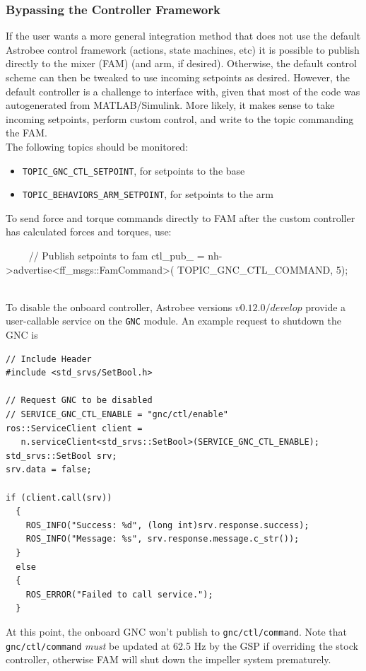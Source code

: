\documentclass{article}
\begin{document}
\subsubsection{Bypassing the Controller Framework}

If the user wants a more general integration method that does not use the default Astrobee control framework (actions, state machines, etc) it is possible to publish directly to the mixer (FAM) (and arm, if desired). Otherwise, the default control scheme can then be tweaked to use incoming setpoints as desired. However, the default controller is a challenge to interface with, given that most of the code was autogenerated from MATLAB/Simulink. More likely, it makes sense to take incoming setpoints, perform custom control, and write to the topic commanding the FAM.\\

The following topics should be monitored:
\begin{itemize}
	\item \texttt{TOPIC\_GNC\_CTL\_SETPOINT}, for setpoints to the base
	\item \texttt{TOPIC\_BEHAVIORS\_ARM\_SETPOINT}, for setpoints to the arm
\end{itemize}

\indent To send force and torque commands directly to FAM after the custom controller has calculated forces and torques, use:
\begin{markdown}
~~~~
//  Publish setpoints to fam
ctl_pub_ = nh->advertise<ff_msgs::FamCommand>(
TOPIC_GNC_CTL_COMMAND, 5);
~~~~
\end{markdown}

To disable the onboard controller, Astrobee versions $v0.12.0/develop$ provide a user-callable service 
on the \texttt{GNC} module. An example request to shutdown the GNC is
\begin{lstlisting}
// Include Header 
#include <std_srvs/SetBool.h>

// Request GNC to be disabled
// SERVICE_GNC_CTL_ENABLE = "gnc/ctl/enable" 
ros::ServiceClient client = 
   n.serviceClient<std_srvs::SetBool>(SERVICE_GNC_CTL_ENABLE);
std_srvs::SetBool srv;
srv.data = false;

if (client.call(srv))
  {
    ROS_INFO("Success: %d", (long int)srv.response.success);
    ROS_INFO("Message: %s", srv.response.message.c_str());
  }
  else
  {
    ROS_ERROR("Failed to call service.");
  }
\end{lstlisting}
At this point, the onboard GNC won't publish to \texttt{gnc/ctl/command}.
Note that \texttt{gnc/ctl/command} \textit{must} be updated at
62.5 Hz by the GSP if overriding the stock controller, otherwise FAM will shut down the
impeller system prematurely.
\end{document}
